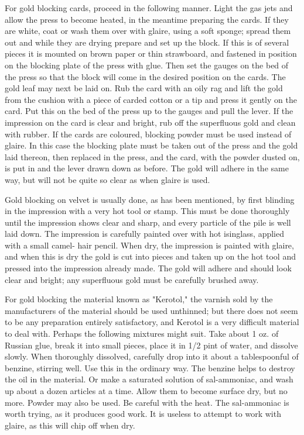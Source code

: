 \documentclass[twoside]{book}
\begin{document}
For gold blocking cards, proceed in the following
manner. Light the gas jets and allow the press to
become heated, in the meantime preparing the cards.
If they are white, coat or wash them over with
glaire, using a soft sponge; spread them out and
while they are drying prepare and set up the block.
If this is of several pieces it is mounted on brown
paper or thin strawboard, and fastened in position
on the blocking plate of the press with glue. Then
set the gauges on the bed of the press so that the
block will come in the desired position on the cards.
The gold leaf may next be laid on. Rub the card
with an oily rag and lift the gold from the cushion
with a piece of carded cotton or a tip and press it
gently on the card. Put this on the bed of the press
up to the gauges and pull the lever. If the impression 
\pagebreak
on the card is clear and bright, rub off the
superfluous gold and clean with rubber. If the cards
are coloured, blocking powder must be used instead of
glaire. In this case the blocking plate must be
taken out of the press and the gold laid thereon,
then replaced in the press, and the card, with the
powder dusted on, is put in and the lever drawn
down as before. The gold will adhere in the same
way, but will not be quite so clear as when glaire
is used.

Gold blocking on velvet is usually done, as has
been mentioned, by first blinding in the impression
with a very hot tool or stamp. This must be done
thoroughly until the impression shows clear and
sharp, and every particle of the pile is well laid
down. The impression is carefully painted over
with hot isinglass, applied with a small camel- hair
pencil. When dry, the impression is painted with
glaire, and when this is dry the gold is cut into
pieces and taken up on the hot tool and pressed
into the impression already made. The gold will
adhere and should look clear and bright; any
superfluous gold must be carefully brushed away.

For gold blocking the material known as "Kerotol,"
the varnish sold by the manufacturers of the
material should be used unthinned; but there does
not seem to be any preparation entirely satisfactory,
and Kerotol is a very difficult material to deal with.
Perhaps the following mixtures might suit. Take
about 1 oz. of Russian glue, break it into small
pieces, place it in 1/2 pint of water, and dissolve
slowly. When thoroughly dissolved, carefully drop
into it about a tablespoonful of benzine, stirring
well. Use this in the ordinary way. The benzine
helps to destroy the oil in the material. Or make
a saturated solution of sal-ammoniac, and wash up
about a dozen articles at a time. Allow them to
become surface dry, but no more. Powder may also
be used. Be careful with the heat. The sal-ammoniac
\pagebreak
is worth trying, as it produces good work.
It is useless to attempt to work with glaire, as this
will chip off when dry.
\end{document}
